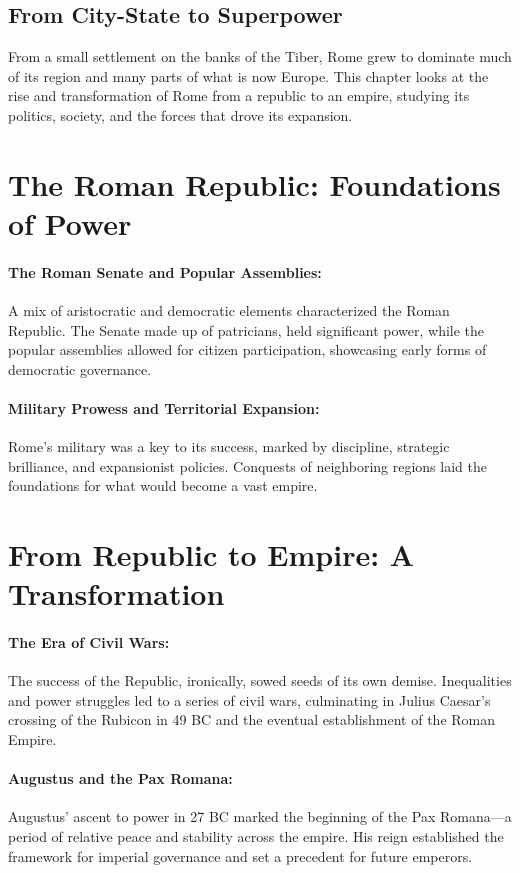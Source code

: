 \documentclass{book}
\begin{document}
\subsection*{From City-State to Superpower}
From a small settlement on the banks of the Tiber, Rome grew to dominate much of its region and many parts of what is now Europe. This chapter looks at the rise and transformation of Rome from a republic to an empire, studying its politics, society, and the forces that drove its expansion.

\section*{The Roman Republic: Foundations of Power}

\paragraph{The Roman Senate and Popular Assemblies:}
A mix of aristocratic and democratic elements characterized the Roman Republic. The Senate made up of patricians, held significant power, while the popular assemblies allowed for citizen participation, showcasing early forms of democratic governance.

\paragraph{Military Prowess and Territorial Expansion:}
Rome's military was a key to its success, marked by discipline, strategic brilliance, and expansionist policies. Conquests of neighboring regions laid the foundations for what would become a vast empire.

\section*{From Republic to Empire: A Transformation}

\paragraph{The Era of Civil Wars:}
The success of the Republic, ironically, sowed seeds of its own demise. Inequalities and power struggles led to a series of civil wars, culminating in Julius Caesar's crossing of the Rubicon in 49 BC and the eventual establishment of the Roman Empire.

\paragraph{Augustus and the Pax Romana:}
Augustus’ ascent to power in 27 BC marked the beginning of the Pax Romana—a period of relative peace and stability across the empire. His reign established the framework for imperial governance and set a precedent for future emperors.
\end{document}
